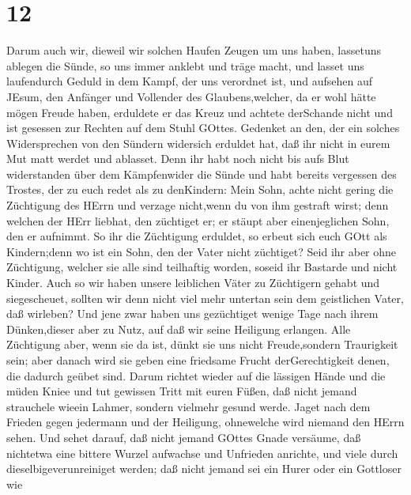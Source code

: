 \hypertarget{section-10}{%
\section{12}\label{section-10}}

 Darum auch wir, dieweil wir solchen Haufen Zeugen um uns
haben, lassetuns ablegen die Sünde, so uns immer anklebt und träge
macht, und lasset uns laufendurch Geduld in dem Kampf, der uns verordnet
ist,  und aufsehen auf JEsum, den Anfänger und Vollender des
Glaubens,welcher, da er wohl hätte mögen Freude haben, erduldete er das
Kreuz und achtete derSchande nicht und ist gesessen zur Rechten auf dem
Stuhl GOttes.  Gedenket an den, der ein solches
Widersprechen von den Sündern widersich erduldet hat, daß ihr nicht in
eurem Mut matt werdet und ablasset.  Denn ihr habt noch
nicht bis aufs Blut widerstanden über dem Kämpfenwider die Sünde
 und habt bereits vergessen des Trostes, der zu euch redet
als zu denKindern: Mein Sohn, achte nicht gering die Züchtigung des
HErrn und verzage nicht,wenn du von ihm gestraft wirst; 
denn welchen der HErr liebhat, den züchtiget er; er stäupt aber
einenjeglichen Sohn, den er aufnimmt.  So ihr die Züchtigung
erduldet, so erbeut sich euch GOtt als Kindern;denn wo ist ein Sohn, den
der Vater nicht züchtiget?  Seid ihr aber ohne Züchtigung,
welcher sie alle sind teilhaftig worden, soseid ihr Bastarde und nicht
Kinder.  Auch so wir haben unsere leiblichen Väter zu
Züchtigern gehabt und siegescheuet, sollten wir denn nicht viel mehr
untertan sein dem geistlichen Vater, daß wirleben?  Und
jene zwar haben uns gezüchtiget wenige Tage nach ihrem Dünken,dieser
aber zu Nutz, auf daß wir seine Heiligung erlangen.  Alle
Züchtigung aber, wenn sie da ist, dünkt sie uns nicht Freude,sondern
Traurigkeit sein; aber danach wird sie geben eine friedsame Frucht
derGerechtigkeit denen, die dadurch geübet sind.  Darum
richtet wieder auf die lässigen Hände und die müden Kniee 
und tut gewissen Tritt mit euren Füßen, daß nicht jemand strauchele
wieein Lahmer, sondern vielmehr gesund werde.  Jaget nach
dem Frieden gegen jedermann und der Heiligung, ohnewelche wird niemand
den HErrn sehen.  Und sehet darauf, daß nicht jemand GOttes
Gnade versäume, daß nichtetwa eine bittere Wurzel aufwachse und
Unfrieden anrichte, und viele durch dieselbigeverunreiniget werden;
 daß nicht jemand sei ein Hurer oder ein Gottloser wie
